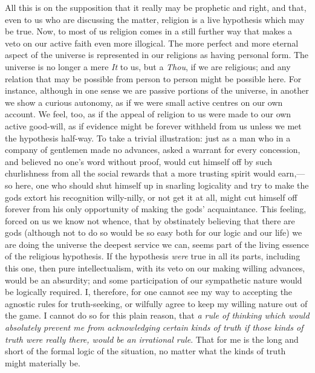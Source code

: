 \documentclass[12pt]{article}
\begin{document}
All this is on the supposition that it really may be prophetic and right, and that, even to us who are discussing the matter, religion is a live hypothesis which may be true.  Now, to most of us religion comes in a still further way that makes a veto on our active faith even more illogical.  The more perfect and more eternal aspect of the universe is represented in our religions as having personal form.  The universe is no longer a mere \emph{It} to us, but a \emph{Thou}, if we are religious; and any relation that may be possible from person to person might be possible  here.  For instance, although in one sense we are passive portions of the universe, in another we show a curious autonomy, as if we were small active centres on our own account.  We feel, too, as if the appeal of religion to us were made to our own active good-will, as if evidence might be forever withheld from us unless we met the hypothesis half-way.  To take a trivial illustration: just as a man who in a company of gentlemen made no advances, asked a warrant for every concession, and believed no one's word without proof, would cut himself off by such churlishness from all the social rewards that a more trusting spirit would earn,--- so here, one who should shut himself up in snarling logicality and try to make the gods extort his recognition willy-nilly, or not get it at all, might cut himself off forever from his only opportunity of making the gods' acquaintance.  This feeling, forced on us we know not whence, that by obstinately believing that there are gods (although not to do so would be so easy both for our logic and our life) we are doing the universe the deepest service we can, seems part of the living essence of the religious hypothesis.  If the hypothesis \emph{were} true in all its parts, including this one, then pure intellectualism, with its veto on our making willing advances, would be an absurdity; and some participation of our sympathetic nature would be logically required.  I, therefore, for one cannot see my way to accepting the agnostic rules for truth-seeking, or wilfully agree to keep my willing nature out of the game.  I cannot do so for this plain reason, that \emph{a rule of thinking which would absolutely prevent me from acknowledging certain kinds of truth if those kinds of truth were really there, would be an irrational rule}.  That for me  is the long and short of the formal logic of the situation, no matter what the kinds of truth might materially be.
\end{document}
